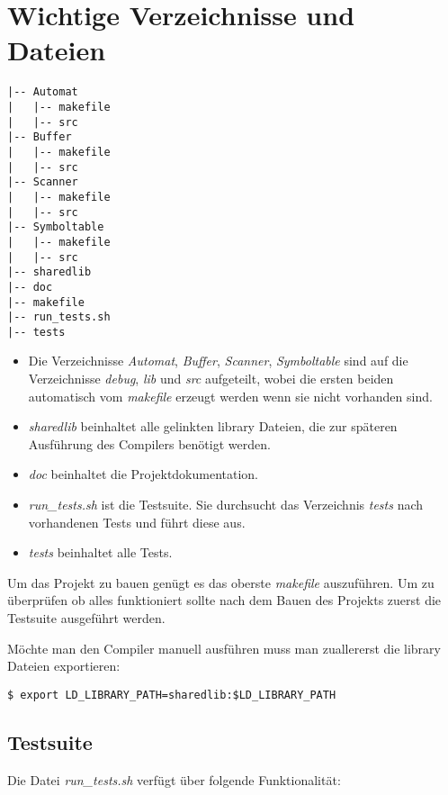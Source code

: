 \documentclass[a4paper,11pt,titlepage,openany,oneside]{scrbook}
\begin{document}
\chapter{Wichtige Verzeichnisse und Dateien}

\begin{verbatim}
|-- Automat
|   |-- makefile
|   |-- src
|-- Buffer
|   |-- makefile
|   |-- src
|-- Scanner
|   |-- makefile
|   |-- src
|-- Symboltable
|   |-- makefile
|   |-- src
|-- sharedlib
|-- doc
|-- makefile
|-- run_tests.sh
|-- tests
\end{verbatim}

\begin{itemize}
  \item Die Verzeichnisse \textit{Automat}, \textit{Buffer}, \textit{Scanner}, \textit{Symboltable} sind auf die Verzeichnisse \textit{debug}, \textit{lib} und \textit{src} aufgeteilt, wobei die ersten beiden automatisch vom \textit{makefile} erzeugt werden wenn sie nicht vorhanden sind.
  \item \textit{sharedlib} beinhaltet alle gelinkten library Dateien, die zur späteren Ausführung des Compilers benötigt werden.
    \item \textit{doc} beinhaltet die Projektdokumentation.
    \item \textit{run\_tests.sh} ist die Testsuite. Sie durchsucht das Verzeichnis \textit{tests} nach vorhandenen Tests und führt diese aus.
    \item \textit{tests} beinhaltet alle Tests.
\end{itemize}

Um das Projekt zu bauen genügt es das oberste \textit{makefile} auszuführen. Um zu überprüfen ob alles funktioniert sollte nach dem Bauen des Projekts zuerst die Testsuite ausgeführt werden.

Möchte man den Compiler manuell ausführen muss man zuallererst die library Dateien exportieren:

\begin{verbatim}
$ export LD_LIBRARY_PATH=sharedlib:$LD_LIBRARY_PATH
\end{verbatim}

\section{Testsuite}

Die Datei \textit{run\_tests.sh} verfügt über folgende Funktionalität:
\end{document}
